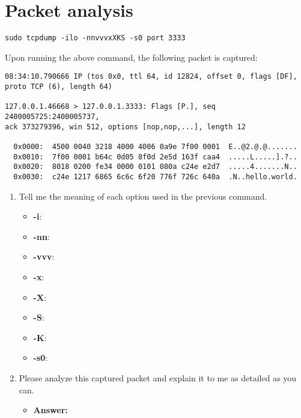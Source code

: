 \documentclass{swfulabreport}
\begin{document}
\maketitle

\section{Packet analysis}\label{packet-analysis}

\begin{verbatim}
sudo tcpdump -ilo -nnvvvxXKS -s0 port 3333
\end{verbatim}

Upon running the above command, the following packet is captured:

\begin{verbatim}
08:34:10.790666 IP (tos 0x0, ttl 64, id 12824, offset 0, flags [DF],
proto TCP (6), length 64)

127.0.0.1.46668 > 127.0.0.1.3333: Flags [P.], seq 2400005725:2400005737,
ack 373279396, win 512, options [nop,nop,...], length 12

  0x0000:  4500 0040 3218 4000 4006 0a9e 7f00 0001  E..@2.@.@.......
  0x0010:  7f00 0001 b64c 0d05 8f0d 2e5d 163f caa4  .....L.....].?..
  0x0020:  8018 0200 fe34 0000 0101 080a c24e e2d7  .....4.......N..
  0x0030:  c24e 1217 6865 6c6c 6f20 776f 726c 640a  .N..hello.world.
\end{verbatim}

\begin{enumerate}
\def\labelenumi{\arabic{enumi}.}
\item
  Tell me the meaning of each option used in the previous command.

  \begin{itemize}
  \tightlist
  \item
    \textbf{-i}:
  \item
    \textbf{-nn}:
  \item
    \textbf{-vvv}:
  \item
    \textbf{-x}:
  \item
    \textbf{-X}:
  \item
    \textbf{-S}:
  \item
    \textbf{-K}:
  \item
    \textbf{-s0}:
  \end{itemize}
\item
  Please analyze this captured packet and explain it to me as detailed
  as you can.

  \begin{itemize}
  \tightlist
  \item
    \textbf{Answer:}
  \end{itemize}
\end{enumerate}
\end{document}
